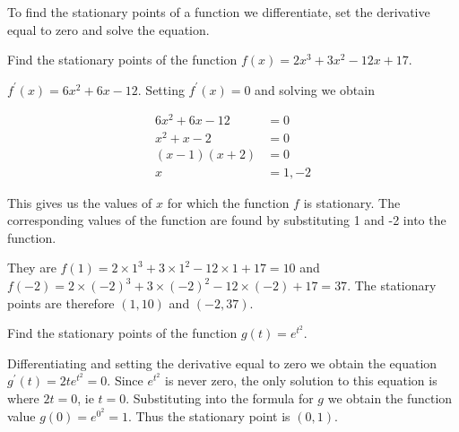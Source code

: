 To find the stationary points of a function we differentiate, set the derivative equal to zero and solve the equation.

\begin{example}

    Find the stationary points of the function $f(x)=2 x^{3}+3 x^{2}-12 x+17$.
    \label{ex:stationary-points-1}
\end{example}


\begin{solution}
    
    $f^{\prime}(x)=6 x^{2}+6 x-12$. Setting $f^{\prime}(x)=0$ and solving we obtain


\[
\begin{aligned}
6 x^{2}+6 x-12 & =0 \\
x^{2}+x-2 & =0 \\
(x-1)(x+2) & =0 \\
x & =1,-2
\end{aligned}
\]

This gives us the values of $x$ for which the function $f$ is stationary. The corresponding values of the function are found by substituting 1 and -2 into the function.

They are $f(1)=2 \times 1^{3}+3 \times 1^{2}-12 \times 1+17=10$ and 
$f(-2)=2 \times(-2)^{3}+3 \times(-2)^{2}-12 \times(-2)+17=37$. The stationary points are therefore $(1,10)$ and $(-2,37)$.
\end{solution}


\begin{example}

    Find the stationary points of the function $g(t)=e^{t^{2}}$.
\end{example}

\begin{solution}
    Differentiating and setting the derivative equal to zero we obtain the equation $g^{\prime}(t)=2 t e^{t^{2}}=0$. Since $e^{t^{2}}$ is never zero, the only solution to this equation is where $2 t=0$, ie $t=0$. Substituting into the formula for $g$ we obtain the function value $g(0)=e^{0^{2}}=1$. Thus the stationary point is $(0,1)$.
\end{solution}


